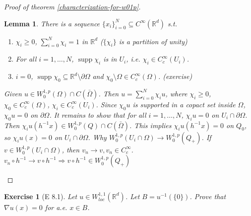 \documentclass{report}
\theoremstyle{tommy}
\newtheorem{lem}[defn]{Lemma}
\newtheorem{ex}[defn]{Exercise}
\newcommand{\supp}{\operatorname{supp}}
\begin{document}
\begin{proof}[Proof of theorem \ref{characterization-for-w01p}]
\begin{itemize}
      \begin{lem}
        There is a sequence \(\{x_i\}_{i=0}^N \subseteq C^\infty(\mathbb{R}^d)\) s.t.
        \begin{enumerate}
          \item \(\chi_i \ge 0\), \(\sum_{i=0}^N \chi_i = 1\) in \(\mathbb{R}^d\) (\(\{\chi_i\}\) is a partition of unity)
          \item For all \(i=1, \dots, N\), \(\supp \chi_i\) is in \(U_i\), i.e. \(\chi_i \in C_c^\infty(U_i)\).
          \item \(i=0\), \(\supp \chi_0 \subseteq \mathbb{R}^d \setminus \partial \Omega\) and \(\chi_0 \setminus \Omega \in C_c^\infty(\Omega)\). (exercise)
        \end{enumerate}
        Given \(u \in W_0^{1,p}(\Omega) \cap C(\bar \Omega)\). Then \(u = \sum_{i=0}^N \chi_i u\), where \(\chi_i \ge 0\), \(\chi_0 \in C_c^\infty(\Omega)\), \(\chi_i \in C_c^\infty(U_i)\). Since \(\chi_0 u\) is supported in a copact set inside \(\Omega\), \(\chi_0 u = 0\) on \(\partial \Omega\). It remains to show that for all \(i=1, \dots, N\), \(\chi_i u = 0\) on \(U_i \cap \partial \Omega\). Then \(\chi_i u(h^{-1}x) \in W_0^{1,p}(Q) \cap C(\bar \Omega)\). This implies \(\chi_i u (h^{-1}x) = 0\) on \(Q_0\), so \(\chi_i u(x) = 0\) on \(U_i \cap \partial \Omega\). 
        Why \(W_0^{1,p}(U_i \cap \Omega) \to W_0^{1,p}(Q_+)\). If \(v \in W_0^{1,p}(U_i \cap \Omega)\), then \(v_n \to v, v_n \in C_c^\infty\). \(v_n \circ h^{-1} \to v \circ h^{-1} \Rightarrow v \circ h^{-1} \in W_0^{1,p}(Q_+)\)
      \end{lem}
    \end{itemize}
  \end{proof}

  \begin{ex}[E 8.1]
    Let \(u \in W_{loc}^{1,1}(\mathbb{R}^d)\). Let \(B = u^{-1}(\{0\})\). Prove that \(\nabla u(x) = 0\) for a.e. \(x \in B\). 
  \end{ex}
\end{document}
